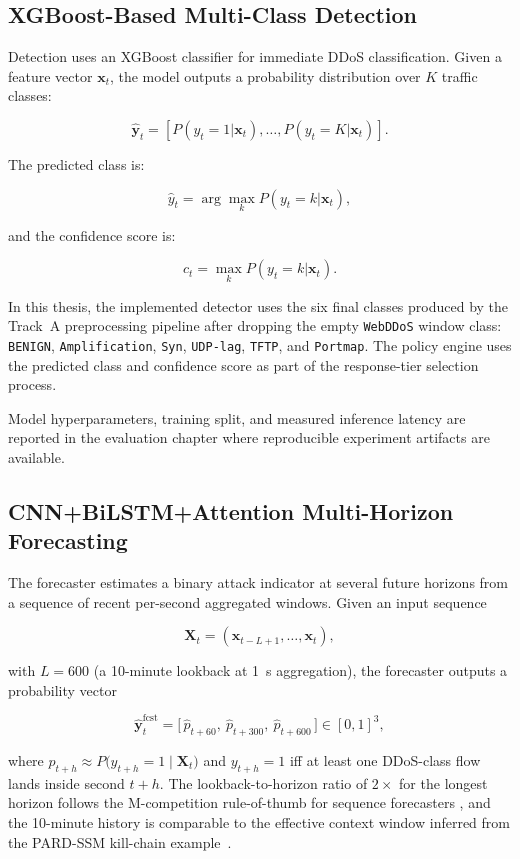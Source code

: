 \documentclass[12pt, a4paper, reqno, oneside]{book}
\begin{document}
\subsection{XGBoost-Based Multi-Class Detection}
\label{subsec:track-a}

Detection uses an XGBoost classifier for immediate DDoS classification. Given a
feature vector \(\mathbf{x}_t\), the model outputs a probability distribution
over \(K\) traffic classes:

\[
    \hat{\mathbf{y}}_t =
    [P(y_t=1|\mathbf{x}_t), \ldots, P(y_t=K|\mathbf{x}_t)].
\]

The predicted class is:

\[
    \hat{y}_t = \arg\max_k P(y_t=k|\mathbf{x}_t),
\]

and the confidence score is:

\[
    c_t = \max_k P(y_t=k|\mathbf{x}_t).
\]

In this thesis, the implemented detector uses the six final classes produced
by the Track~A preprocessing pipeline after dropping the empty
\texttt{WebDDoS} window class:
\texttt{BENIGN}, \texttt{Amplification}, \texttt{Syn}, \texttt{UDP-lag},
\texttt{TFTP}, and \texttt{Portmap}. The policy engine uses the predicted
class and confidence score as part of the response-tier selection process.

Model hyperparameters, training split, and measured inference latency are
reported in the evaluation chapter where reproducible experiment artifacts are
available.

\subsection{CNN+BiLSTM+Attention Multi-Horizon Forecasting}
\label{subsec:track-b}

The forecaster estimates a binary attack indicator at several future horizons
from a sequence of recent per-second aggregated windows. Given an input
sequence

\[
    \mathbf{X}_t =
    (\mathbf{x}_{t-L+1}, \ldots, \mathbf{x}_{t}),
\]

with $L=600$ (a 10-minute lookback at 1~s aggregation), the forecaster outputs
a probability vector

\[
    \hat{\mathbf{y}}_{t}^{\text{fcst}} =
    \bigl[\, \hat{p}_{t+60},\ \hat{p}_{t+300},\ \hat{p}_{t+600}\,\bigr]
    \in [0,1]^{3},
\]

where $\hat{p}_{t+h} \approx P\!\bigl(y_{t+h}=1 \mid \mathbf{X}_t\bigr)$ and
$y_{t+h}\!=\!1$ iff at least one DDoS-class flow lands inside second
$t+h$. The lookback-to-horizon ratio of $2{\times}$ for the longest horizon
follows the M-competition rule-of-thumb for sequence forecasters
\cite{hyndman2018forecasting}, and the 10-minute history is comparable to the
effective context window inferred from the PARD-SSM kill-chain
example~\cite{hiremath2026pardssm}.
\end{document}
